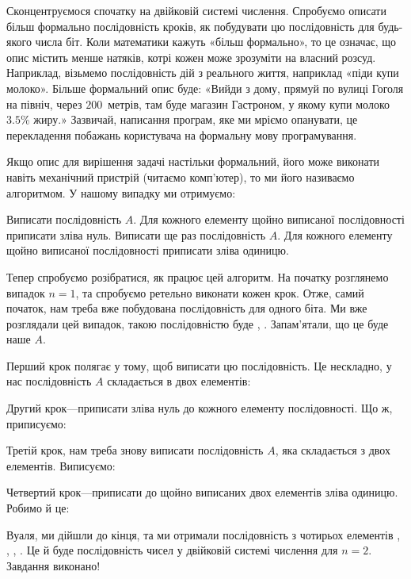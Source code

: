 Сконцентруємося спочатку на двійковій системі числення.
Спробуємо описати більш формально послідовність кроків, як побудувати цю послідовність для будь-якого числа біт.
Коли математики кажуть «більш формально», то це означає, що опис містить менше натяків, котрі кожен може зрозуміти на власний розсуд.
Наприклад, візьмемо послідовність дій з реального життя, наприклад «піди купи молоко».
Більше формальний опис буде: «Вийди з дому, прямуй по вулиці Гоголя на північ, через $200$~метрів, там буде магазин Гастроном, у якому купи молоко~$3.5$\% жиру.»
Зазвичай, написання програм, яке ми мріємо опанувати,  це перекладення побажань користувача на формальну мову програмування.

Якщо опис для вирішення задачі настільки формальний, його може виконати навіть механічний пристрій (читаємо комп'ютер), то ми його називаємо алгоритмом.
У нашому випадку ми отримуємо:

\begin{algorithm}
  \begin{algsteps}
    \algstep Виписати послідовність $A$.
    \algstep Для кожного елементу щойно виписаної послідовності приписати зліва нуль.
    \algstep Виписати ще раз послідовність $A$.
    \algstep Для кожного елементу щойно виписаної послідовності приписати зліва одиницю.
  \end{algsteps}
\end{algorithm}

Тепер спробуємо розібратися, як працює цей алгоритм.
На початку розглянемо випадок $n=1$, та спробуємо ретельно виконати кожен крок.
Отже, самий початок, нам треба вже побудована послідовність для одного біта.
Ми вже розглядали цей випадок, такою послідовністю буде , .
Запам'ятали, що це буде наше $A$.

Перший крок полягає у тому, щоб виписати цю послідовність.
Це нескладно, у нас послідовність $A$ складається в двох елементів:
\par{}\par
Другий крок---приписати зліва нуль до кожного елементу послідовності.
Що ж, приписуємо:
\par{}\par
Третій крок, нам треба знову виписати послідовність $A$, яка складається з двох елементів.
Виписуємо:
\par{}\par
Четвертий крок---приписати до щойно виписаних двох елементів зліва одиницю.
Робимо й це:
\par{}\par
Вуаля, ми дійшли до кінця, та ми отримали послідовність з чотирьох елементів , , , .
Це й буде послідовність чисел у двійковій системі числення для $n=2$.
Завдання виконано!

